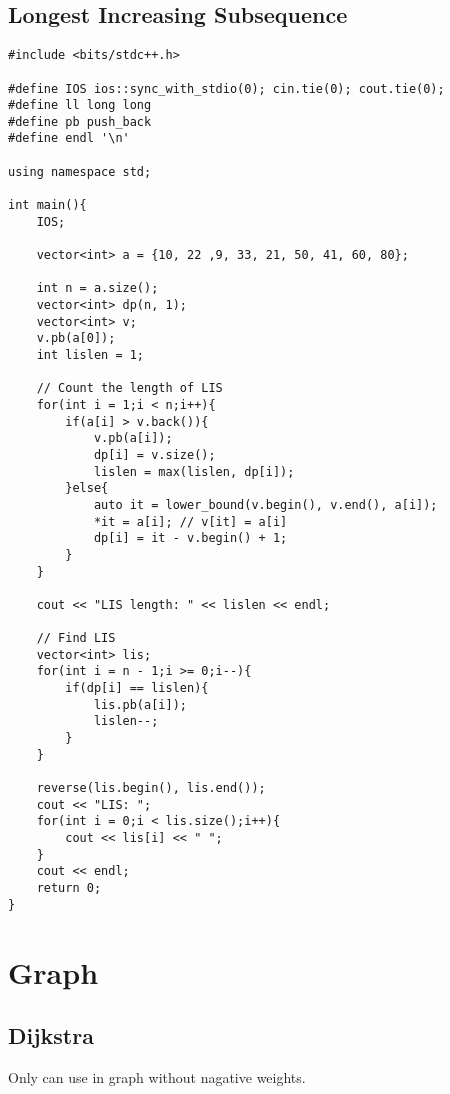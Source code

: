 \documentclass[12pt, a4paper]{article}
\begin{document}
\subsection{Longest Increasing Subsequence}
\begin{lstlisting}
#include <bits/stdc++.h>

#define IOS ios::sync_with_stdio(0); cin.tie(0); cout.tie(0);
#define ll long long
#define pb push_back
#define endl '\n'

using namespace std;

int main(){
    IOS;
    
    vector<int> a = {10, 22 ,9, 33, 21, 50, 41, 60, 80};

    int n = a.size();
    vector<int> dp(n, 1); 
    vector<int> v;        
    v.pb(a[0]);
    int lislen = 1;       

    // Count the length of LIS
    for(int i = 1;i < n;i++){
        if(a[i] > v.back()){ 
            v.pb(a[i]);
            dp[i] = v.size();
            lislen = max(lislen, dp[i]);
        }else{
            auto it = lower_bound(v.begin(), v.end(), a[i]); 
            *it = a[i]; // v[it] = a[i]
            dp[i] = it - v.begin() + 1;
        }
    }

    cout << "LIS length: " << lislen << endl;

    // Find LIS
    vector<int> lis;
    for(int i = n - 1;i >= 0;i--){
        if(dp[i] == lislen){
            lis.pb(a[i]);
            lislen--;
        }
    }

    reverse(lis.begin(), lis.end());
    cout << "LIS: ";
    for(int i = 0;i < lis.size();i++){
        cout << lis[i] << " ";
    }
    cout << endl;
    return 0;
}
\end{lstlisting}

\section{Graph}
\subsection{Dijkstra}

Only can use in graph without nagative weights.
\end{document}

